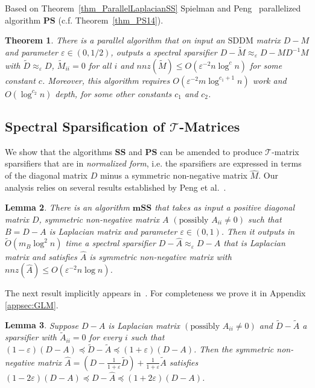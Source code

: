 \documentclass[11pt]{article}
\newcommand{\SDDM}{\mathrm{SDDM}}
\newcommand{\GL}{\mathcal{T}}
\newcommand{\iSS}{\mathrm{\mathbf{SS}}}
\newcommand{\mSS}{\mathrm{\mathbf{mSS}}}
\newcommand{\PS}{\mathbf{PS}}
\newcommand{\wD}{\widetilde{D}}
\newcommand{\wA}{\widetilde{A}}
\newcommand{\wM}{\widetilde{M}}
\newcommand{\wO}{\widetilde{O}}
\newcommand{\hM}{\widehat{M}}
\newcommand{\hA}{\widehat{A}}
\newcommand{\Di}{D^{-1}}
\newcommand{\eps}{\epsilon}
\renewcommand{\leq}{\leqslant}
\renewcommand{\eps}{\varepsilon}
\newtheorem{thm}{Theorem}  \newtheorem{fact}[thm]{Fact}
\newtheorem{lem}[thm]{Lemma}
\numberwithin{thm}{section}
\begin{document}
Based on Theorem~\ref{thm_ParallelLaplacianSS} Spielman and Peng~\cite{PS14} parallelized algorithm $\PS$ (c.f. Theorem~\ref{thm_PS14}).

\begin{thm}\label{thm_pPS14}\cite{PS14}
There is a parallel algorithm that on input an $\SDDM$ matrix $D-M$ and parameter $\eps\in(0,1/2)$, outputs a spectral sparsifier $D-\wM\approx_{\eps}D-M\Di M$ with $\wD\approx_{\eps}D$, $\wM_{ii}=0$ for all $i$ and $nnz(\wM)\leq O(\eps^{-2}n\log^{c}n)$ for some constant $c$. Moreover, this algorithm requires $O(\eps^{-2}m\log^{c_1+1}n)$ work and $O(\log^{c_2}n)$ depth, for some other constants $c_1$ and $c_2$.
\end{thm}


\subsection{Spectral Sparsification of $\GL$-Matrices}\label{subsec:SSGL}

We show that the algorithms $\iSS$ and $\PS$ can be amended to produce $\GL$-matrix sparsifiers that are in \emph{normalized form}, i.e. the sparsifiers are expressed in terms of the diagonal matrix $D$ minus a symmetric non-negative matrix $\hM$. Our analysis relies on several results established by Peng et al.~\cite{PengPhd13,PS14,CCLPT14,CCLPT15}.

\begin{lem}\label{lemSSDA}
There is an algorithm $\mSS$ that takes as input a positive diagonal matrix $D$, symmetric non-negative matrix $A$ $(\text{possibly }A_{ii}\neq0)$ such that $B=D-A$ is Laplacian matrix and parameter $\eps\in(0,1)$. Then it outputs in $\wO(m_B\log^{2}n)$
time a spectral sparsifier $D-\hA\approx_{\eps}D-A$ that is Laplacian matrix and satisfies $\hA$ is symmetric non-negative matrix with $nnz(\hA)\leq O(\eps^{-2}n\log n)$.
\end{lem}

The next result implicitly appears in~\cite{CCLPT15}. For completeness we prove it in Appendix \ref{appsec:GLM}.

\begin{lem}\label{lem_my_DappToD}
Suppose $D-A$ is Laplacian matrix $(\text{possibly }A_{ii}\neq0)$ and $\wD-\wA$ a sparsifier with $\wA_{ii}=0$ for every $i$ such that $(1-\eps)(D-A)\preceq\wD-\wA\preceq(1+\eps)(D-A)$.
Then the symmetric non-negative matrix $\hA=(D-\frac{1}{1+\eps}\wD)+\frac{1}{1+\eps}\wA$
satisfies $(1-2\eps)(D-A)\preceq D-\hA\preceq(1+2\eps)(D-A)$.
\end{lem}
\end{document}
